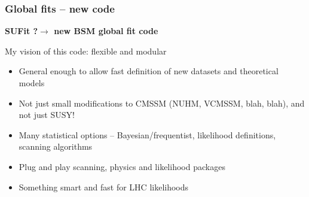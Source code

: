 \documentclass[xcolor=dvipsnames]{beamer}
\begin{document}
\begin{frame}
\frametitle{Global fits -- new code}

\textbf{SUFit ?$\rightarrow$ new BSM global fit code}\vspace{5mm}

My vision of this code: flexible and modular
\begin{itemize}
\item General enough to allow fast definition of new datasets and theoretical models
\item Not just small modifications to CMSSM (NUHM, VCMSSM, blah, blah), and not just SUSY!
\item Many statistical options -- Bayesian/frequentist, likelihood definitions, scanning algorithms
\item Plug and play scanning, physics and likelihood packages
\item Something smart and fast for LHC likelihoods
\end{itemize}

\end{frame}
\end{document}
